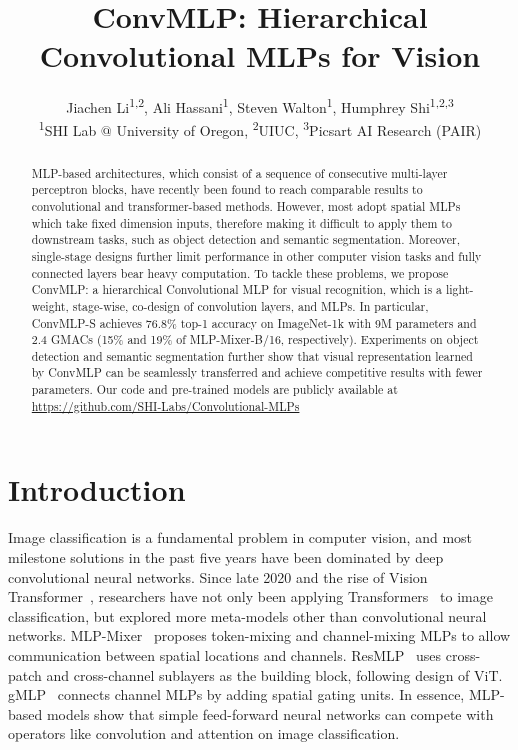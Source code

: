 \documentclass[final]{cvpr}
\begin{document}
\title{ConvMLP:  Hierarchical Convolutional MLPs for Vision}

\author{ Jiachen Li\textsuperscript{1,2}, Ali Hassani\textsuperscript{1}, Steven Walton\textsuperscript{1}, Humphrey Shi\textsuperscript{1,2,3} \\
{\small \textsuperscript{1}SHI Lab $@$ University of Oregon, \textsuperscript{2}UIUC, \textsuperscript{3}Picsart AI Research (PAIR)}\\
}

\maketitle

\begin{abstract}
MLP-based architectures, which consist of a sequence of consecutive multi-layer perceptron blocks, have recently been found to reach comparable results to convolutional and transformer-based methods. However, most adopt spatial MLPs which take fixed dimension inputs, therefore making it difficult to apply them to downstream tasks, such as object detection and semantic segmentation. Moreover, single-stage designs further limit performance in other computer vision tasks and fully connected layers bear heavy computation. To tackle these problems, we propose ConvMLP: a hierarchical Convolutional MLP for visual recognition, which is a light-weight, stage-wise, co-design of convolution layers, and MLPs. In particular, ConvMLP-S achieves 76.8\% top-1 accuracy on ImageNet-1k with 9M parameters and 2.4 GMACs (15\% and 19\% of MLP-Mixer-B/16, respectively).
Experiments on object detection and semantic segmentation further show that visual representation learned by ConvMLP can be seamlessly transferred and achieve competitive results with fewer parameters. 
Our code and pre-trained models are publicly available at \href{https://github.com/SHI-Labs/Convolutional-MLPs}{https://github.com/SHI-Labs/Convolutional-MLPs}
\end{abstract}

\section{Introduction}
Image classification is a fundamental problem in computer vision, and most milestone solutions in the past five years have been dominated by deep convolutional neural networks. Since late 2020 and the rise of Vision Transformer~\cite{dosovitskiy2020image}, researchers have not only been applying Transformers~\cite{vaswani2017attention} to image classification, but explored more meta-models other than convolutional neural networks. MLP-Mixer~\cite{tolstikhin2021mlp} proposes token-mixing and channel-mixing MLPs to allow communication between spatial locations and channels. ResMLP~\cite{touvron2021resmlp} uses cross-patch and cross-channel sublayers as the building block, following design of ViT. gMLP~\cite{liu2021pay} connects channel MLPs by adding spatial gating units. In essence, MLP-based models show that simple feed-forward neural networks can compete with operators like convolution and attention on image classification.
\end{document}
